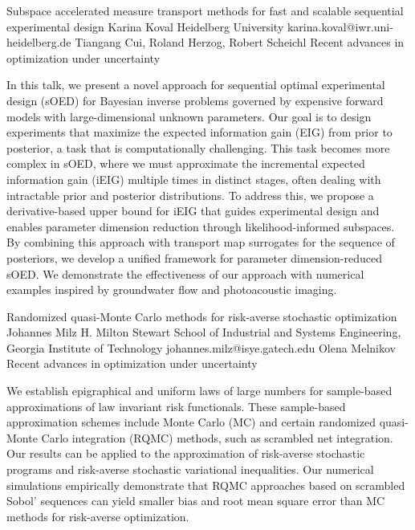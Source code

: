 \begin{talk}
  {Subspace accelerated measure transport methods for fast and scalable sequential
experimental design}%
  {Karina Koval}%
  {Heidelberg University}%
  {karina.koval@iwr.uni-heidelberg.de}%
  {Tiangang Cui, Roland Herzog, Robert Scheichl}%
  {Recent advances in optimization under uncertainty}%
    
   
In this talk, we present a novel approach for sequential optimal experimental design (sOED) for Bayesian inverse problems governed by expensive forward models with large-dimensional unknown parameters. Our goal is to design experiments that maximize the expected information gain (EIG) from prior to posterior, a task that is computationally challenging. This task becomes more complex in sOED, where we must approximate the incremental expected information gain (iEIG) multiple times in distinct stages, often dealing with intractable prior and posterior distributions. To address this, we propose a derivative-based upper bound for iEIG that guides experimental design and enables parameter dimension reduction through likelihood-informed subspaces. By combining this approach with transport map surrogates for the sequence of posteriors, we develop a unified framework for parameter dimension-reduced sOED. We demonstrate the effectiveness of our approach with numerical examples inspired by groundwater flow and photoacoustic imaging.
\end{talk}

\begin{talk}
  {Randomized quasi-Monte Carlo methods for risk-averse stochastic optimization}%
  {Johannes Milz}%
  {H. Milton Stewart School of Industrial and Systems Engineering, Georgia Institute of Technology}%
  {johannes.milz@isye.gatech.edu}%
  {Olena Melnikov}%
  {Recent advances in optimization under uncertainty}%
    

We establish epigraphical and uniform laws of large numbers for sample-based approximations of law invariant risk functionals. These sample-based approximation schemes include Monte Carlo (MC) and certain randomized quasi-Monte Carlo integration (RQMC) methods, such as scrambled net integration. Our results can be applied to the approximation of risk-averse stochastic programs and risk-averse stochastic variational inequalities. Our numerical simulations empirically demonstrate that RQMC approaches based on scrambled Sobol' sequences can yield smaller bias and root mean square error than MC methods for risk-averse optimization.




\end{talk}

